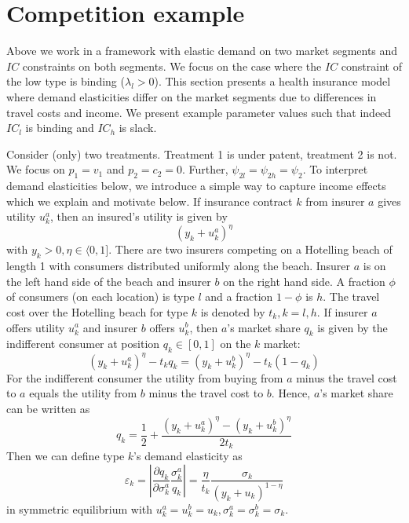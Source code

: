 \documentclass[12pt,english,a4paper]{article}
\begin{document}
\section{Competition example}
\label{sec:org43a4758}
\label{sec:example}

Above we work in a framework with elastic demand on two market segments and \(IC\) constraints on both segments. We focus on the case where the \(IC\) constraint of the low type is binding (\(\lambda_l>0\)). This section presents a health insurance model where demand elasticities differ on the market segments due to differences in travel costs and income. We present example parameter values such that indeed \(IC_l\) is binding and \(IC_h\) is slack.

Consider (only) two treatments. Treatment 1 is under patent, treatment 2 is not. We focus on \(p_1=v_1\) and \(p_2=c_2=0\). Further, \(\psi_{2l}=\psi_{2h}=\psi_2\). To interpret demand elasticities below, we introduce a simple way to capture income effects which we explain and motivate below. If insurance contract \(k\) from insurer \(a\) gives utility \(u_k^a\), then an insured's utility is given by
\begin{equation}
\label{eq:50}
(y_k+u_k^a)^{\eta}
\end{equation}
with \(y_k>0, \eta \in \langle 0,1]\). There are two insurers competing on a Hotelling beach of length 1 with consumers distributed uniformly along the beach. Insurer \(a\) is on the left hand side of the beach and insurer \(b\) on the right hand side. A fraction \(\phi\) of consumers (on each location) is type \(l\) and a fraction \(1-\phi\) is \(h\). The travel cost over the Hotelling beach for type \(k\) is denoted by \(t_k, k=l,h\). If insurer \(a\) offers utility \(u_k^a\) and insurer \(b\) offers \(u_k^b\), then \(a\)'s market share \(q_k\) is given by the indifferent consumer at position \(q_k \in [0,1]\) on the \(k\) market:
\begin{equation}
\label{eq:18}
(y_k+u_k^a)^{\eta} - t_k q_k = (y_k+u_k^b)^{\eta} - t_k (1-q_k)
\end{equation}
For the indifferent consumer the utility from buying from \(a\) minus the travel cost to \(a\) equals the utility from \(b\) minus the travel cost to \(b\). Hence, \(a\)'s market share can be written as
\begin{equation}
\label{eq:19}
q_k = \frac{1}{2} + \frac{(y_k+u_k^a)^{\eta} - (y_k+u_k^b)^{\eta}}{2t_k}
\end{equation}
Then we can define type \(k\)'s demand elasticity as
\begin{equation}
\label{eq:51}
\varepsilon_k = \left| \frac{\partial q_k}{\partial \sigma_k^a} \frac{\sigma_k^a}{q_k} \right| = \frac{\eta}{t_k}\frac{\sigma_k}{(y_k+u_k)^{1-\eta}}
\end{equation}
in symmetric equilibrium with \(u_k^a=u_k^b=u_k,\sigma_k^a=\sigma_k^{b}=\sigma_k\).
\end{document}
